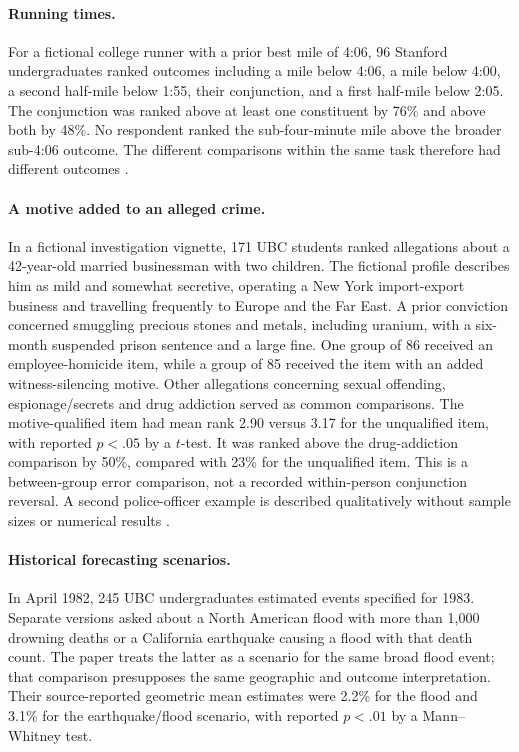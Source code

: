 \paragraph{Running times.}
For a fictional college runner with a prior best mile of 4:06,
96 Stanford undergraduates ranked outcomes including a mile below
4:06, a mile below 4:00, a second half-mile below 1:55, their
conjunction, and a first half-mile below 2:05.
The conjunction was ranked above at least one constituent by 76\%
and above both by 48\%. No respondent ranked the sub-four-minute
mile above the broader sub-4:06 outcome.
The different comparisons within the same task therefore had
different outcomes \cite[p.~306]{TverskyKahneman1983Conjunction}.

\paragraph{A motive added to an alleged crime.}
In a fictional investigation vignette, 171 UBC students ranked
allegations about a 42-year-old married businessman with two children.
The fictional profile describes him as mild and somewhat secretive,
operating a New York import-export business and travelling frequently
to Europe and the Far East. A prior conviction concerned smuggling
precious stones and metals, including uranium, with a six-month
suspended prison sentence and a large fine.
One group of 86 received an employee-homicide item, while a group
of 85 received the item with an added witness-silencing motive.
Other allegations concerning sexual offending, espionage/secrets and
drug addiction served as common comparisons.
The motive-qualified item had mean rank 2.90 versus 3.17 for the
unqualified item, with reported \(p<.05\) by a \(t\)-test.
It was ranked above the drug-addiction comparison by 50\%, compared
with 23\% for the unqualified item. This is a between-group error
comparison, not a recorded within-person conjunction reversal.
A second police-officer example is described qualitatively without
sample sizes or numerical results \cite[pp.~306--307]{TverskyKahneman1983Conjunction}.

\paragraph{Historical forecasting scenarios.}
In April 1982, 245 UBC undergraduates estimated events specified
for 1983. Separate versions asked about a North American flood
with more than 1,000 drowning deaths or a California earthquake causing
a flood with that death count. The paper treats the latter as a
scenario for the same broad flood event; that comparison presupposes
the same geographic and outcome interpretation.
Their source-reported geometric mean estimates were
2.2\% for the flood and 3.1\% for the earthquake/flood scenario,
with reported \(p<.01\) by a Mann--Whitney test.

